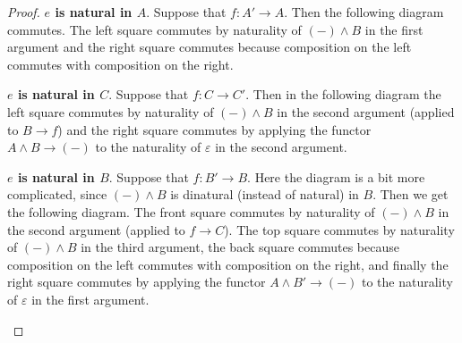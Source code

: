 \documentclass{article}
\newcommand{\pmap}{\to}
\renewcommand{\smash}{\wedge}
\renewcommand{\epsilon}{\varepsilon}
\begin{document}
\begin{proof}
\textbf{$e$ is natural in $A$}. Suppose that $f:A'\pmap A$. Then the following diagram commutes. The left square commutes by naturality of $({-})\smash B$ in the first argument and the right square commutes because composition on the left commutes with composition on the right.
\begin{center}
\end{center}

\textbf{$e$ is natural in $C$}. Suppose that $f:C\pmap C'$. Then in the following diagram the left square commutes by naturality of $({-})\smash B$ in the second argument (applied to $B\pmap f$) and the right square commutes by applying the functor $A\smash B \pmap({-})$ to the naturality of $\epsilon$ in the second argument.
\begin{center}
\end{center}

\textbf{$e$ is natural in $B$}. Suppose that $f:B'\pmap B$. Here the diagram is a bit more
complicated, since $({-})\smash B$ is dinatural (instead of natural) in $B$. Then we get the
following diagram. The front square commutes by naturality of $({-})\smash B$ in the second argument
(applied to $f\pmap C$). The top square commutes by naturality of $({-})\smash B$ in the third
argument, the back square commutes because composition on the left commutes with composition on the
right, and finally the right square commutes by applying the functor $A\smash B' \pmap({-})$ to the
naturality of $\epsilon$ in the first argument.
\begin{center}
\end{center}


\end{proof}
\end{document}
